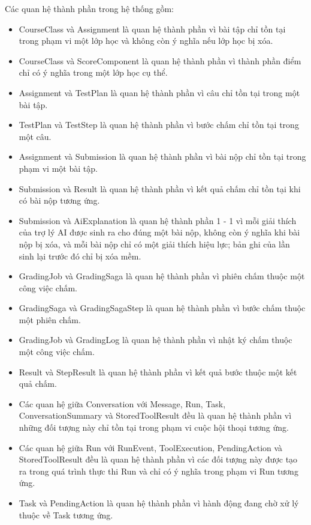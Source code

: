 \documentclass[../BTL.tex]{subfiles}
\begin{document}
Các quan hệ thành phần trong hệ thống gồm:

\begin{itemize}[leftmargin=*, nosep]
    \item CourseClass và Assignment là quan hệ thành phần vì bài tập chỉ tồn tại trong phạm vi một lớp học và không còn ý nghĩa nếu lớp học bị xóa.
    \item CourseClass và ScoreComponent là quan hệ thành phần vì thành phần điểm chỉ có ý nghĩa trong một lớp học cụ thể.
    \item Assignment và TestPlan là quan hệ thành phần vì câu chỉ tồn tại trong một bài tập.
    \item TestPlan và TestStep là quan hệ thành phần vì bước chấm chỉ tồn tại trong một câu.
    \item Assignment và Submission là quan hệ thành phần vì bài nộp chỉ tồn tại trong phạm vi một bài tập.
    \item Submission và Result là quan hệ thành phần vì kết quả chấm chỉ tồn tại khi có bài nộp tương ứng.
    \item Submission và AiExplanation là quan hệ thành phần 1 - 1 vì mỗi giải thích của trợ lý AI được sinh ra cho đúng một bài nộp, không còn ý nghĩa khi bài nộp bị xóa, và mỗi bài nộp chỉ có một giải thích hiệu lực; bản ghi của lần sinh lại trước đó chỉ bị xóa mềm.
    \item GradingJob và GradingSaga là quan hệ thành phần vì phiên chấm thuộc một công việc chấm.
    \item GradingSaga và GradingSagaStep là quan hệ thành phần vì bước chấm thuộc một phiên chấm.
    \item GradingJob và GradingLog là quan hệ thành phần vì nhật ký chấm thuộc một công việc chấm.
    \item Result và StepResult là quan hệ thành phần vì kết quả bước thuộc một kết quả chấm.
    \item Các quan hệ giữa Conversation với Message, Run, Task, ConversationSummary và StoredToolResult đều là quan hệ thành phần vì những đối tượng này chỉ tồn tại trong phạm vi cuộc hội thoại tương ứng.
    \item Các quan hệ giữa Run với RunEvent, ToolExecution, PendingAction và StoredToolResult đều là quan hệ thành phần vì các đối tượng này được tạo ra trong quá trình thực thi Run và chỉ có ý nghĩa trong phạm vi Run tương ứng.
    \item Task và PendingAction là quan hệ thành phần vì hành động đang chờ xử lý thuộc về Task tương ứng.
\end{itemize}
\end{document}
